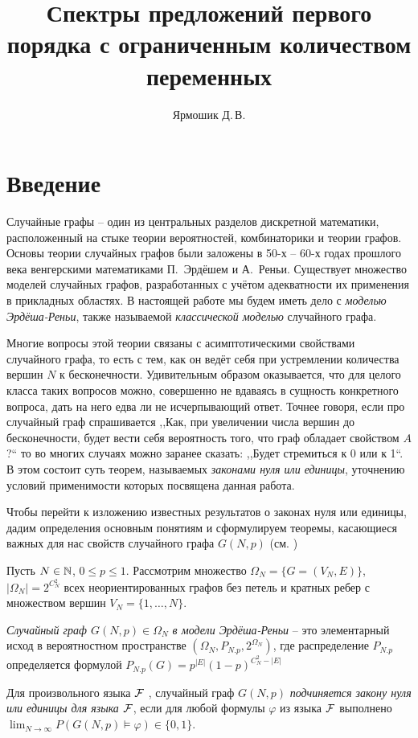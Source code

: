 \documentclass{mipt-thesis-bs}
\title{Спектры предложений первого порядка с ограниченным количеством переменных}
\author{Ярмошик Д.\,В.}
\begin{document}
    \frontmatter
    \titlecontents

    \mainmatter


    \chapter{Введение}
    Случайные графы -- один из центральных разделов дискретной математики, расположенный на стыке теории вероятностей, комбинаторики и теории графов.
    Основы теории случайных графов были заложены в 50-х -- 60-х годах прошлого века венгерскими математиками П.~Эрдёшем и А.~Реньи.
    Существует множество моделей случайных графов, разработанных с учётом адекватности их применения в прикладных областях.
    В настоящей работе мы будем иметь дело с \textit{моделью Эрдёша-Реньи}, также называемой \textit{классической моделью} случайного графа.
    
    Многие вопросы этой теории связаны с асимптотическими свойствами случайного графа, то есть с тем, как он ведёт себя при устремлении количества вершин $N$ к бесконечности.
    Удивительным образом оказывается, что для целого класса таких вопросов можно, совершенно не вдаваясь в сущность конкретного вопроса, дать на него едва ли не исчерпывающий ответ.
    Точнее говоря, если про случайный граф спрашивается ,,Как, при увеличении числа вершин до бесконечности, будет вести себя вероятность того, что граф обладает свойством $A$?`` то во многих случаях можно заранее сказать: ,,Будет стремиться к 0 или к 1``.
    В этом состоит суть теорем, называемых \textit{законами нуля или единицы}, уточнению условий применимости которых посвящена данная работа.
    
    Чтобы перейти к изложению известных результатов о законах нуля или единицы, дадим определения основным понятиям и сформулируем теоремы, касающиеся важных для нас свойств случайного графа $G(N,p)$ (см. \cite{survey2015})
    
    Пусть $N \in \mathbb {N}$, $0 \leq p \leq 1$. Рассмотрим множество $\Omega_N = \{G = (V_N , E)\}$, $|\Omega_N| = 2^{C_N^2}$ всех неориентированных графов без петель и кратных ребер с множеством вершин $V_N = \{1, \ldots, N \}$.
    
    \Def \textit{Случайный граф $G(N, p) \in \Omega_N$  в модели Эрдёша-Реньи} -- это элементарный исход в вероятностном пространстве $(\Omega_N, P_{N.p}, 2^{\Omega_N})$, где  распределение $P_{N.p}$ определяется формулой $P_{N.p}(G) = p^{|E|}(1-p)^{C_N^2-|E|}$
    
    \Def Для произвольного языка $\mathcal{F}$ , случайный граф $G(N, p)$ \textit{подчиняется закону нуля или единицы для языка $\mathcal{F}$},
    если для любой формулы $\varphi$ из языка 
    $\mathcal{F}$  выполнено
    $\lim_{N \rightarrow \infty} P(G(N, p) \vDash \varphi) \in \{0, 1\}$.
    
\end{document}

